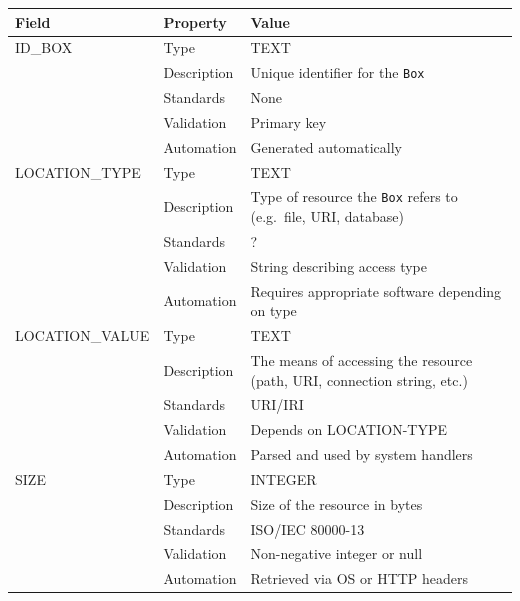 \documentclass[
]{article}
\newcounter{none} %
\begin{document}
{\def\LTcaptype{none} %
\begin{longtable}[]{@{}
  >{\raggedright\arraybackslash}p{}
  >{\raggedright\arraybackslash}p{}
  >{\raggedright\arraybackslash}p{}@{}}
\toprule\noalign{}
\begin{minipage}[b]{\linewidth}\raggedright
Field
\end{minipage} & \begin{minipage}[b]{\linewidth}\raggedright
Property
\end{minipage} & \begin{minipage}[b]{\linewidth}\raggedright
Value
\end{minipage} \\
\midrule\noalign{}
\endhead
\bottomrule\noalign{}
\endlastfoot
ID\_BOX & Type & TEXT \\
& Description & Unique identifier for the \texttt{Box} \\
& Standards & None \\
& Validation & Primary key \\
& Automation & Generated automatically \\
LOCATION\_TYPE & Type & TEXT \\
& Description & Type of resource the \texttt{Box} refers to (e.g.~file,
URI, database) \\
& Standards & ? \\
& Validation & String describing access type \\
& Automation & Requires appropriate software depending on type \\
LOCATION\_VALUE & Type & TEXT \\
& Description & The means of accessing the resource (path, URI,
connection string, etc.) \\
& Standards & URI/IRI \\
& Validation & Depends on LOCATION-TYPE \\
& Automation & Parsed and used by system handlers \\
SIZE & Type & INTEGER \\
& Description & Size of the resource in bytes \\
& Standards & ISO/IEC 80000-13 \\
& Validation & Non-negative integer or null \\
& Automation & Retrieved via OS or HTTP headers \\

\end{longtable}}
\end{document}
